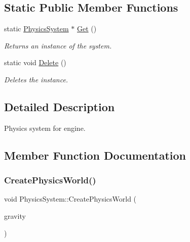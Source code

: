 \subsection*{Static Public Member Functions}
\begin{DoxyCompactItemize}
\item 
\mbox{\label{class_physics_system_ad40ddb4eaaa38a223440d98080c1ddfc}} 
static \mbox{\hyperlink{class_physics_system}{Physics\+System}} $\ast$ \mbox{\hyperlink{class_physics_system_ad40ddb4eaaa38a223440d98080c1ddfc}{Get}} ()
\begin{DoxyCompactList}\small\item\em Returns an instance of the system. \end{DoxyCompactList}\item 
\mbox{\label{class_physics_system_a40db15dde9716172d2ba1d7622a196fd}} 
static void \mbox{\hyperlink{class_physics_system_a40db15dde9716172d2ba1d7622a196fd}{Delete}} ()
\begin{DoxyCompactList}\small\item\em Deletes the instance. \end{DoxyCompactList}\end{DoxyCompactItemize}


\subsection{Detailed Description}
Physics system for engine. 

\subsection{Member Function Documentation}
\mbox{\label{class_physics_system_afa1b487619b6e9e1c16ec03fb9fd4270}} 
\subsubsection{\texorpdfstring{Create\+Physics\+World()}{CreatePhysicsWorld()}}
{\footnotesize\ttfamily void Physics\+System\+::\+Create\+Physics\+World (\begin{DoxyParamCaption}\item[{b2\+Vec2}]{gravity }\end{DoxyParamCaption})}



